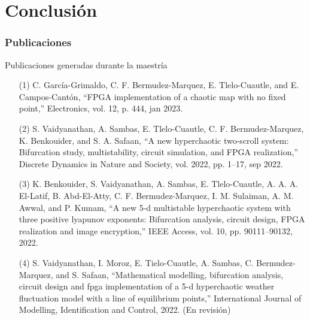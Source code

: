 \documentclass[10pt]{beamer}
\begin{document}
\section{Conclusión}

\begin{frame}
    \frametitle{Publicaciones}
    \begin{block}{Publicaciones generadas durante la maestría}
        \justifying
        \begin{scriptsize}
            \begin{enumerate} 
            \item[(1)] C. García-Grimaldo, C. F. Bermudez-Marquez, E. Tlelo-Cuautle, and E. Campos-Cantón, ``FPGA implementation of a chaotic map with no fixed point,'' Electronics, vol. 12, p. 444, jan 2023.

            \item[(2)] S. Vaidyanathan, A. Sambas, E. Tlelo-Cuautle, C. F. Bermudez-Marquez, K. Benkouider, and S. A. Safaan, ``A new hyperchaotic two-scroll system: Bifurcation study, multistability, circuit simulation, and FPGA realization,'' Discrete Dynamics in Nature and Society, vol. 2022, pp. 1–17, sep 2022.

            \item[(3)] K. Benkouider, S. Vaidyanathan, A. Sambas, E. Tlelo-Cuautle, A. A. A. El-Latif, B. Abd-El-Atty, C. F. Bermudez-Marquez, I. M. Sulaiman, A. M. Awwal, and P. Kumam, ``A new 5-d multistable hyperchaotic system with three positive lyapunov exponents: Bifurcation analysis, circuit design, FPGA realization and image encryption,'' IEEE Access, vol. 10, pp. 90111–90132, 2022.

            \item[(4)] S. Vaidyanathan, I. Moroz, E. Tielo-Cuautle, A. Sambas, C. Bermudez-Marquez, and S. Safaan, ``Mathematical modelling, bifurcation analysis, circuit design and fpga implementation of a 5-d hyperchaotic weather fluctuation model with a line of equilibrium points,'' International Journal of Modelling, Identification and Control, 2022. (En revisión)
            \end{enumerate}

        \end{scriptsize}
        
	\end{block}
\end{frame}
\end{document}
